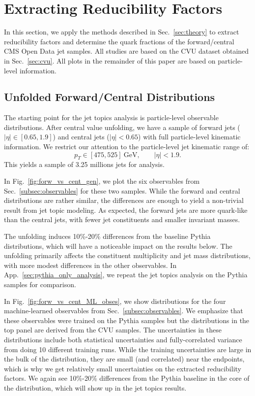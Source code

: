 \documentclass[aps,prd,twocolumn,preprintnumbers,nofootinbib,longbibliography,floatfix]{revtex4-1}
\DeclareRobustCommand{\Sec}[1]{Sec.~\ref{#1}}
\DeclareRobustCommand{\App}[1]{App.~\ref{#1}}
\DeclareRobustCommand{\Fig}[1]{Fig.~\ref{#1}}
\newcommand{\GeV}{\text{GeV}}
\newcommand{\Pythia}{{\sc Pythia}\xspace}
\newcommand{\cor}[1]{#1}
\begin{document}
\section{Extracting Reducibility Factors}
\label{section:extracting_k}


In this section, we apply the methods described in \Sec{sec:theory} to extract reducibility factors and determine the quark fractions of the forward/central CMS Open Data jet samples.
%
All studies are based on the CVU dataset obtained in \Sec{sec:cvu}.
%
\cor{All plots in the remainder of this paper are based on particle-level information.}

\subsection{Unfolded Forward/Central Distributions}



The starting point for the jet topics analysis is particle-level observable distributions.
%
After central value unfolding, we have a sample of forward jets ($|\eta| \in [0.65,1.9]$) and central jets ($|\eta| < 0.65$) with full particle-level kinematic information.
%
We restrict our attention to the particle-level jet kinematic range of:
%
\begin{equation}
	p_T \in [475,525]~\GeV, \qquad |\eta| < 1.9.
\end{equation}
%
This yields a sample of 3.25 millions jets for analysis.


In \Fig{fig:forw_vs_cent_gen}, we plot the six observables from \Sec{subsec:observables} for these two samples.
%
While the forward and central distributions are rather similar, the differences are enough to yield a non-trivial result from jet topic modeling.
%
As expected, the forward jets are more quark-like than the central jets, with fewer jet constituents and smaller invariant masses.


The unfolding induces 10\%-20\% differences from the baseline \Pythia distributions, which will have a noticeable impact on the results below.
%
The unfolding primarily affects the constituent multiplicity and jet mass distributions, with more modest differences in the other observables.
%
In \App{sec:pythia_only_analysis}, we repeat the jet topics analysis on the \Pythia samples for comparison.


In \Fig{fig:forw_vs_cent_ML_obses}, we show distributions for the four machine-learned observables from \Sec{subsec:observables}.
%
We emphasize that these observables were trained on the \Pythia samples but the distributions in the top panel are derived from the CVU samples.
%
The uncertainties in these distributions include both statistical uncertainties and fully-correlated variance from doing 10 different training runs.
%
While the training uncertainties are large in the bulk of the distribution, they are small (and correlated) near the endpoints, which is why we get relatively small uncertainties on the extracted reducibility factors.
%
We again see 10\%-20\% differences from the \Pythia baseline in the core of the distribution, which will show up in the jet topics results.
\end{document}
